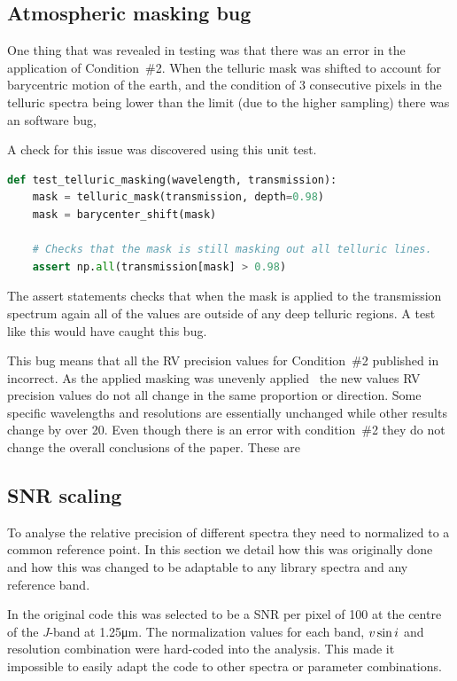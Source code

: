 \subsection{Atmospheric masking bug}
\label{subsec:condition_two_bug}
One thing that was revealed in testing was that there was an error in the application of Condition~\#2. When the telluric mask was shifted to account for barycentric motion of the earth, and the condition of 3 consecutive pixels in the telluric spectra being lower than the limit (due to the higher sampling) there was an software bug,


A check for this issue was discovered using this unit test.
\begin{lstlisting}[language=Python, caption=Example unit test to catch masking bug.]
def test_telluric_masking(wavelength, transmission):
    mask = telluric_mask(transmission, depth=0.98)
    mask = barycenter_shift(mask)

    # Checks that the mask is still masking out all telluric lines.
    assert np.all(transmission[mask] > 0.98)
\end{lstlisting}
The assert statements checks that when the mask is applied to the transmission spectrum again all of the values are outside of any deep telluric regions. A test like this would have caught this bug.

This bug means that all the {RV} precision values for Condition~\#2 published in~\citet{figueira_radial_2016} incorrect. As the applied masking was unevenly applied~\citet{figueira_radial_2016} the new values {RV} precision values do not all change in the same proportion or direction. Some specific wavelengths and resolutions are essentially unchanged while other results change by over 20\mps{}.  Even though there is an error with condition~\#2 they do not change the overall conclusions of the paper. These are 

\subsection{SNR scaling}
\label{subsec:snr_scaling}
To analyse the relative precision of different spectra they need to normalized to a common reference point. In this section we detail how this was originally done and how this was changed to be adaptable to any library spectra and any reference band.

In the original code this was selected to be a {SNR} per pixel of 100 at the centre of the \textit{J}-band at 1.25\si{\micro\meter}. The normalization values for each band, \(v\sin{i}\) and resolution combination were hard-coded into the analysis. This made it impossible to easily adapt the code to other spectra or parameter combinations.

